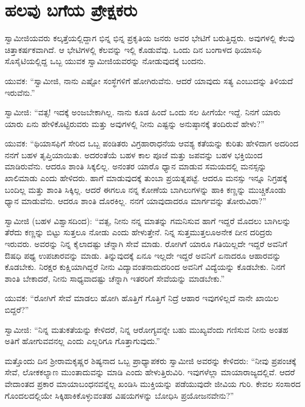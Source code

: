 
\chapter{ಹಲವು ಬಗೆಯ ಪ್ರೇಕ್ಷಕರು }

 ಸ್ವಾಮೀಜಿಯವರು ಕಲ್ಕತ್ತೆಯಲ್ಲಿದ್ದಾಗ ಭಿನ್ನ ಭಿನ್ನ ಪ್ರಕೃತಿಯ ಜನರು ಅವರ ಭೇಟಿಗೆ ಬರುತ್ತಿದ್ದರು. ಅವುಗಳಲ್ಲಿ ಕೆಲವು ಚಿತ್ತಾಕರ್ಷಕವಾಗಿದೆ. ಆ ಭೇಟಿಗಳಲ್ಲಿ ಕೆಲವನ್ನು ಇಲ್ಲಿ ಕೊಡುವೆವು. ಒಂದು ದಿನ ಬಂಗಾಳದ ಥಿಯಾಸಫಿ ಸೊಸೈಟಿಯಲ್ಲಿದ್ದ ಒಬ್ಬ ಯುವಕ ಸ್ವಾಮೀಜಿಯವರನ್ನು ನೋಡುವುದಕ್ಕೆ ಬಂದನು. 

 ಯುವಕ: “ಸ್ವಾಮೀಜಿ, ನಾನು ಎಷ್ಟೋ ಸಂಸ್ಥೆಗಳಿಗೆ ಹೋಗಿರುವೆನು. ಆದರೆ ಯಾವುದು ಸತ್ಯ ಎಂಬುದನ್ನು ತಿಳಿಯದೆ ಇರುವೆನು.” 

 ಸ್ವಾಮೀಜಿ: “ವತ್ಸ! ಇದಕ್ಕೆ ಅಂಜಬೇಕಾಗಿಲ್ಲ. ನಾನು ಕೂಡ ಹಿಂದೆ ಒಂದು ಸಲ ಹೀಗೆಯೇ ಇದ್ದೆ. ನಿನಗೆ ಯಾರು ಯಾರು ಏನು ಹೇಳಿಕೊಟ್ಟಿರುವರು ಮತ್ತು ಅವುಗಳಲ್ಲಿ ನೀನು ಎಷ್ಟನ್ನು ಅನುಷ್ಠಾನಕ್ಕೆ ತಂದಿರುವೆ ಹೇಳು?” 

 ಯುವಕ: “ಥಿಯಾಸಫಿಗೆ ಸೇರಿದ ಒಬ್ಬ ಪಂಡಿತರು ವಿಗ್ರಹಾರಾಧನೆಯ ಆವಶ್ಯ ಕತೆಯನ್ನು ಕುರಿತು ಹೇಳಿದಾಗ ಅದರಿಂದ ನನಗೆ ಬಹಳ ತೃಪ್ತಿಯಾಯಿತು. ಅದರಂತೆಯೆ ಬಹಳ ಕಾಲ ಪೂಜೆ ಮತ್ತು ಜಪವನ್ನು ಬಹಳ ಭಕ್ತಿಯಿಂದ ಮಾಡಿರುವೆನು. ಆದರೂ ಶಾಂತಿ ಸಿಕ್ಕಲಿಲ್ಲ. ಅನಂತರ ಯಾರೊ ಧ್ಯಾನ ಮಾಡುವ ಸಮಯದಲ್ಲಿ ಮನಸ್ಸನ್ನು ಖಾಲಿಮಾಡು ಎಂದು ಹೇಳಿದರು. ಹಾಗೆ ಮಾಡುವುದಕ್ಕೆ ತುಂಬಾ ಪ್ರಯತ್ನಪಟ್ಟೆ. ಆದರೂ ಮನಸ್ಸು ಇನ್ನೂ ನಿಗ್ರಹಕ್ಕೆ ಬಂದಿಲ್ಲ ಮತ್ತು ಶಾಂತಿ ಸಿಕ್ಕಿಲ್ಲ. ಆದರೆ ಈಗಲೂ ನನ್ನ ಕೋಣೆಯ ಬಾಗಿಲುಗಳನ್ನು ಹಾಕಿ ಕಣ್ಣನ್ನು ಮುಚ್ಚಿಕೊಂಡು ಧ್ಯಾನ ಮಾಡುವೆನು. ಆದರೂ ಶಾಂತಿ ದೊರಕಿಲ್ಲ. ನನಗೆ ಯಾವುದಾದರೂ ಮಾರ್ಗವನ್ನು ತೋರುವಿರಾ?”‌ 

 ಸ್ವಾಮೀಜಿ (ಬಹಳ ವಿಶ್ವಾಸದಿಂದ): “ವತ್ಸ, ನೀನು ನನ್ನ ಮಾತನ್ನು ಗಮನಿಸುವ ಹಾಗೆ ಇದ್ದರೆ ಮೊದಲು ಬಾಗಿಲನ್ನು ತೆರೆದು ಕಣ್ಣನ್ನು ಬಿಟ್ಟು ಸುತ್ತಲೂ ನೋಡು ಎಂದು ಹೇಳುತ್ತೇನೆ. ನಿನ್ನ ಸುತ್ತಮುತ್ತಲೂ‌ಅನೇಕ ದೀನ ದರಿದ್ರರು ಇರುವರು. ಅವರನ್ನು ನಿನ್ನ ಕೈಲಾದಷ್ಟು ಚೆನ್ನಾಗಿ ಸೇವೆ ಮಾಡು. ರೋಗಿಗೆ ಯಾರೂ ಗತಿಯಿಲ್ಲದೇ ಇದ್ದರೆ ಅವನಿಗೆ ಔಷಧಿ ಪಥ್ಯ ಉಪಚಾರವನ್ನು ಮಾಡು. ತಿನ್ನುವುದಕ್ಕೆ ಏನೂ ಇಲ್ಲದೇ ಇದ್ದರೆ ಅವನಿಗೆ ಏನಾದರೂ ಆಹಾರವನ್ನು ಕೊಡಬೇಕು. ನಿರಕ್ಷರ ಕುಕ್ಷಿಯಾಗಿದ್ದರೆ ನೀನು ವಿದ್ಯಾವಂತನಾದುದರಿಂದ ಅವನಿಗೆ ವಿದ್ಯೆಯನ್ನು ಕೊಡಬೇಕು. ನಿನಗೆ ಶಾಂತಿ ಬೇಕಾದರೆ, ನೀನು ಸಾಧ್ಯವಾದಷ್ಟು ಚೆನ್ನಾಗಿ ಇತರರಿಗೆ ಸೇವೆಯನ್ನು ಮಾಡಬೇಕು.” 

 ಯುವಕ: “ರೋಗಿಗೆ ಸೇವೆ ಮಾಡಲು ಹೋಗಿ ಹೊತ್ತಿಗೆ ಗೊತ್ತಿಗೆ ನಿದ್ರೆ ಆಹಾರ ಇವುಗಳಿಲ್ಲದೆ ನಾನೇ ಖಾಯಿಲ ಬಿದ್ದರೆ?” 

 ಸ್ವಾಮೀಜಿ: “ನಿನ್ನ ಮತುಕತೆಯನ್ನು ಕೇಳಿದರೆ, ನಿನ್ನ ಆರೋಗ್ಯವನ್ನೇ ಬಹು ಮುಖ್ಯವೆಂದು ಗಣಿಸುವ ನೀನು ಅಂತಹ ಅತಿಗೆ ಹೋಗುವವನಲ್ಲ ಎಂದು ಎಲ್ಲರಿಗೂ ಗೊತ್ತಾಗುವುದು.” 

 ಮತ್ತೊಂದು ದಿನ ಶ‍್ರೀರಾಮಕೃಷ್ಣರ ಶಿಷ್ಯನಾದ ಒಬ್ಬ ಪ್ರಾಧ್ಯಾಪಕರು ಸ್ವಾಮೀಜಿ ಅವರನ್ನು ಕೇಳಿದರು: “ನೀವು ಪ್ರಪಂಚಕ್ಕೆ ಸೇವೆ, ಲೋಕಕಲ್ಯಾಣ ಮುಂತಾದುವನ್ನು ಮಾಡಿ ಎಂದು ಹೇಳುತ್ತಿರುವಿರಿ. ಇವುಗಳೆಲ್ಲಾ ಮಾಯಾರಾಜ್ಯದಲ್ಲಿವೆ. ಆದರೆ ವೇದಾಂತದ ಪ್ರಕಾರ ಮಾಯಾಬಂಧನವನ್ನೆಲ್ಲ ಖಂಡಿಸಿ ಮುಕ್ತಿಯನ್ನು ಪಡೆಯುವುದೇ ಜೀವಿಯ ಗುರಿ. ಕೇವಲ ಸಂಸಾರದ ಗೊಂದಲದಲ್ಲಿಯೇ ಸಿಕ್ಕಿಹಾಕಿಕೊಳ್ಳುವಂತಹ ವಿಷಯಗಳನ್ನು ಬೋಧಿಸಿ ಪ್ರಯೋಜನವೇನು?” 

